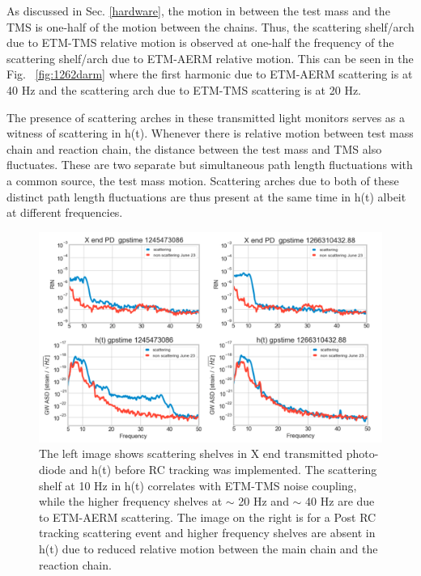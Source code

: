 \documentclass[12pt]{iopart}
\begin{document}

As discussed in Sec. \ref{hardware}, the motion in between the test mass and the TMS is one-half of the motion between the chains.
Thus, the scattering shelf/arch due to ETM-TMS relative motion is observed at one-half the frequency of the scattering shelf/arch due to ETM-AERM relative motion. This can be seen in the Fig. ~\ref{fig:1262darm} where the first harmonic due to ETM-AERM scattering is at 40 Hz and the scattering arch due to ETM-TMS scattering is at 20 Hz.



The presence of scattering arches in these transmitted light monitors serves as a witness of scattering in h(t). Whenever there is relative motion between test mass chain and reaction chain, the distance between the test mass and TMS also fluctuates. These are two separate but simultaneous path length fluctuations with a common source, the test mass motion. Scattering arches due to both of these distinct path length fluctuations are thus present at the same time in h(t) albeit at different frequencies.
\par
\begin{figure}[h]
    \centering
    \includegraphics[width=\textwidth]{etm-transmon.png}
    \caption{The left image shows scattering shelves in X end transmitted photo-diode and h(t) before RC tracking was implemented. The scattering shelf at 10 Hz in h(t) correlates with ETM-TMS noise coupling, while the higher frequency shelves at $\sim$ 20 Hz and $\sim$ 40 Hz are due to ETM-AERM scattering. The image on the right is for a Post RC tracking scattering event and higher frequency shelves are absent in h(t) due to reduced relative motion between the main chain and the reaction chain.}
    \label{fig:etm-transmon}
\end{figure}
\end{document}
